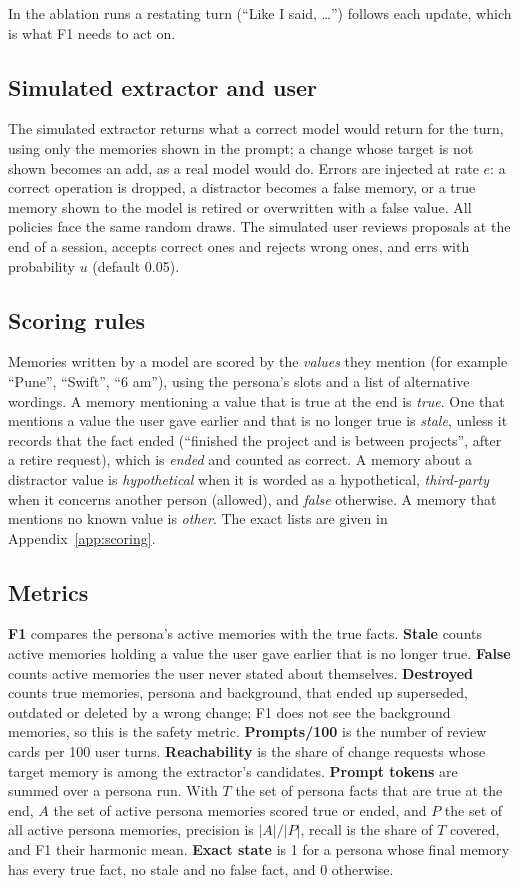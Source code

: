\IfFileExists{IEEEtran.cls}{\documentclass[journal]{IEEEtran}\def\HAVEIEEE{1}}{\documentclass[10pt,twocolumn]{article}\usepackage[margin=0.7in,columnsep=0.25in]{geometry}}
\begin{document}
In the ablation runs a restating turn (``Like I said, \ldots'') follows each update, which is what F1 needs to act on.

\subsection{Simulated extractor and user}
The simulated extractor returns what a correct model would return for the turn, using only the memories shown in the prompt; a change whose target is not shown becomes an add, as a real model would do. Errors are injected at rate $e$: a correct operation is dropped, a distractor becomes a false memory, or a true memory shown to the model is retired or overwritten with a false value. All policies face the same random draws. The simulated user reviews proposals at the end of a session, accepts correct ones and rejects wrong ones, and errs with probability $u$ (default 0.05).

\subsection{Scoring rules}
Memories written by a model are scored by the \emph{values} they mention (for example ``Pune'', ``Swift'', ``6 am''), using the persona's slots and a list of alternative wordings. A memory mentioning a value that is true at the end is \emph{true}. One that mentions a value the user gave earlier and that is no longer true is \emph{stale}, unless it records that the fact ended (``finished the project and is between projects'', after a retire request), which is \emph{ended} and counted as correct. A memory about a distractor value is \emph{hypothetical} when it is worded as a hypothetical, \emph{third-party} when it concerns another person (allowed), and \emph{false} otherwise. A memory that mentions no known value is \emph{other}. The exact lists are given in Appendix~\ref{app:scoring}.

\subsection{Metrics}
\textbf{F1} compares the persona's active memories with the true facts. \textbf{Stale} counts active memories holding a value the user gave earlier that is no longer true. \textbf{False} counts active memories the user never stated about themselves. \textbf{Destroyed} counts true memories, persona and background, that ended up superseded, outdated or deleted by a wrong change; F1 does not see the background memories, so this is the safety metric. \textbf{Prompts/100} is the number of review cards per 100 user turns. \textbf{Reachability} is the share of change requests whose target memory is among the extractor's candidates. \textbf{Prompt tokens} are summed over a persona run. With $T$ the set of persona facts that are true at the end, $A$ the set of active persona memories scored true or ended, and $P$ the set of all active persona memories, precision is $|A|/|P|$, recall is the share of $T$ covered, and F1 their harmonic mean. \textbf{Exact state} is 1 for a persona whose final memory has every true fact, no stale and no false fact, and 0 otherwise.
\end{document}
